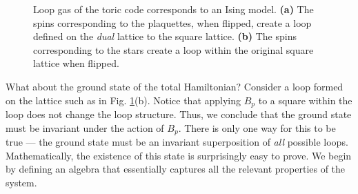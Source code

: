 \documentclass[prb,11pt, nofootinbib]{revtex4-2}
\theoremstyle{definition}
\theoremstyle{definition}
\theoremstyle{definition}
\theoremstyle{definition}
\newcommand{\note}[1]{{\color{red} {#1}}}
\renewcommand{\note}[1]{{}}
\begin{document}
\begin{figure}
\begin{center}
{
		}
		\hspace{1cm}
	\end{center}
	\caption{Loop gas of the toric code corresponds to an Ising model. \textbf{(a)} The spins corresponding to the plaquettes, when flipped, create a loop defined on the \emph{dual} lattice to the square lattice. \textbf{(b)} The spins corresponding to the stars create a loop within the original square lattice when flipped.}
	\label{fig:loopgas}
\end{figure}
What about the ground state of the total Hamiltonian? Consider a loop formed on the lattice such as in Fig. \ref{fig:loopgas}(b). Notice that applying $B_p$ to a square within the loop does not change the loop structure\note{ Draw it out}. Thus, we conclude that the ground state must be invariant under the action of $B_p$. There is only one way for this to be true --- the ground state must be an invariant superposition of \emph{all} possible loops. Mathematically, the existence of this state is surprisingly easy to prove. We begin by defining an algebra that essentially captures all the relevant properties of the system. 
\end{document}
